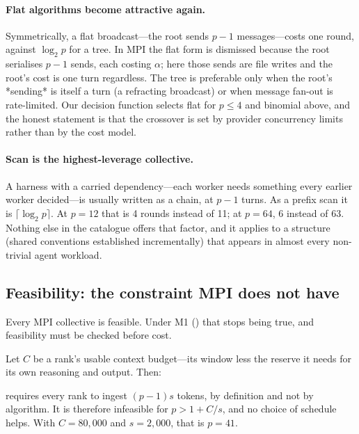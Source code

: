 \paragraph{Flat algorithms become attractive again.}
Symmetrically, a flat broadcast---the root sends $p-1$ messages---costs one
round, against $\log_2 p$ for a tree. In MPI the flat form is dismissed
because the root serialises $p-1$ sends, each costing $\alpha$; here those
sends are file writes and the root's cost is one turn regardless. The tree
is preferable only when the root's *sending* is itself a turn (a refracting
broadcast) or when message fan-out is rate-limited. Our decision function
selects flat for $p \le 4$ and binomial above, and the honest statement is
that the crossover is set by provider concurrency limits rather than by the
cost model.

\paragraph{Scan is the highest-leverage collective.}
A harness with a carried dependency---each worker needs something every
earlier worker decided---is usually written as a chain, at $p-1$ turns. As a
prefix scan it is $\lceil\log_2 p\rceil$. At $p=12$ that is 4 rounds instead
of 11; at $p=64$, 6 instead of 63. Nothing else in the catalogue offers that
factor, and it applies to a structure (shared conventions established
incrementally) that appears in almost every non-trivial agent workload.

\subsection{Feasibility: the constraint MPI does not have}
\label{sec:cost-cumulative}

Every MPI collective is feasible. Under M1 () that stops being
true, and feasibility must be checked before cost.

Let $C$ be a rank's usable context budget---its window less the reserve it
needs for its own reasoning and output. Then:

\begin{observation}
 requires every rank to ingest $(p-1)s$ tokens, by definition
and not by algorithm. It is therefore infeasible for
$p > 1 + C/s$, and no choice of schedule helps. With $C = 80{,}000$ and
$s = 2{,}000$, that is $p = 41$.
\end{observation}

